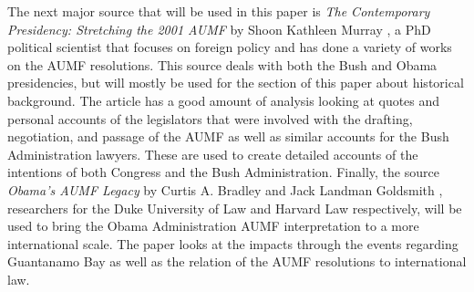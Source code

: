 \documentclass[12pt]{article}
\begin{document}
The next major source that will be used in this paper is \textit{The Contemporary Presidency: Stretching the 2001 AUMF} by Shoon Kathleen Murray \autocite{murray2015}, a PhD political scientist that focuses on foreign policy and has done a variety of works on the AUMF resolutions.
This source deals with both the Bush and Obama presidencies, but will mostly be used for the section of this paper about historical background.
The article has a good amount of analysis looking at quotes and personal accounts of the legislators that were involved with the drafting, negotiation, and passage of the AUMF as well as similar accounts for the Bush Administration lawyers.
These are used to create detailed accounts of the intentions of both Congress and the Bush Administration.
Finally, the source \textit{Obama's AUMF Legacy} by Curtis A. Bradley and Jack Landman Goldsmith \autocite{bradley2016}, researchers for the Duke University of Law and Harvard Law respectively, will be used to bring the Obama Administration AUMF interpretation to a more international scale.
The paper looks at the impacts through the events regarding Guantanamo Bay as well as the relation of the AUMF resolutions to international law.

\newpage
{}
\printbibliography[heading=none]{}
\end{document}
